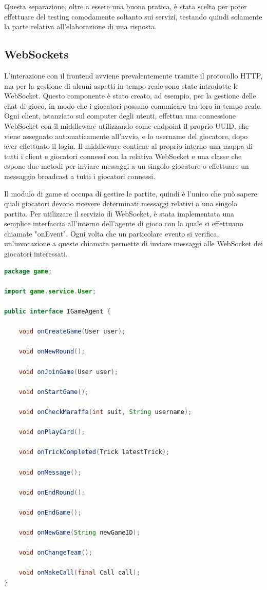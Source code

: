 Questa separazione, oltre a essere una buona pratica, è stata scelta per poter effettuare del testing comodamente soltanto sui servizi, testando quindi solamente la parte relativa all'elaborazione di una risposta.

\subsection{WebSockets}

L'interazione con il frontend avviene prevalentemente tramite il protocollo HTTP, ma per la gestione di alcuni aspetti in tempo reale sono state introdotte le WebSocket.
Questo componente è stato creato, ad esempio, per la gestione delle chat di gioco, in modo che i giocatori possano comunicare tra loro in tempo reale. Ogni client, istanziato sul computer degli utenti, effettua una connessione WebSocket con il middleware utilizzando come endpoint il proprio UUID, che viene assegnato automaticamente all'avvio, e lo username del giocatore, dopo aver effettuato il login. Il middleware contiene al proprio interno una mappa di tutti i client e giocatori connessi con la relativa WebSocket e una classe che espone due metodi per inviare messaggi a un singolo giocatore o effettuare un messaggio broadcast a tutti i giocatori connessi.

Il modulo di game si occupa di gestire le partite, quindi è l'unico che può sapere quali giocatori devono ricevere determinati messaggi relativi a una singola partita. Per utilizzare il servizio di WebSocket, è stata implementata una semplice interfaccia all'interno dell'agente di gioco con la quale si effettuano chiamate "onEvent". Ogni volta che un particolare evento si verifica, un'invocazione a queste chiamate permette di inviare messaggi alle WebSocket dei giocatori interessati.

\begin{lstlisting}[language=Java, caption={Interfaccia per gestire chiamate websocket}, label=list:java_websocket_interface]
package game;

import game.service.User;

public interface IGameAgent {

	void onCreateGame(User user);

	void onNewRound();

	void onJoinGame(User user);

	void onStartGame();

	void onCheckMaraffa(int suit, String username);

	void onPlayCard();

	void onTrickCompleted(Trick latestTrick);

	void onMessage();

	void onEndRound();

	void onEndGame();

	void onNewGame(String newGameID);

	void onChangeTeam();

	void onMakeCall(final Call call);
}
\end{lstlisting}


